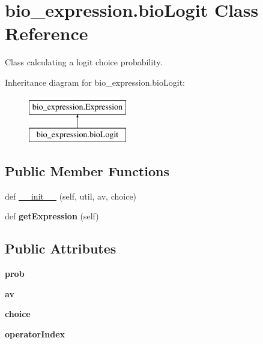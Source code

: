 \hypertarget{classbio__expression_1_1bio_logit}{}\section{bio\+\_\+expression.\+bio\+Logit Class Reference}
\label{classbio__expression_1_1bio_logit}


Class calculating a logit choice probability.  


Inheritance diagram for bio\+\_\+expression.\+bio\+Logit\+:\begin{figure}[H]
\begin{center}
\leavevmode
\includegraphics[height=2.000000cm]{classbio__expression_1_1bio_logit}
\end{center}
\end{figure}
\subsection*{Public Member Functions}
\begin{DoxyCompactItemize}
\item 
def \hyperlink{classbio__expression_1_1bio_logit_a25567c2014b5b34edc7769df7a3a312a}{\+\_\+\+\_\+init\+\_\+\+\_\+} (self, util, av, choice)
\item 
def {\bfseries get\+Expression} (self)\hypertarget{classbio__expression_1_1bio_logit_a35b306d8e0b89a2fd97d4d3649da531f}{}\label{classbio__expression_1_1bio_logit_a35b306d8e0b89a2fd97d4d3649da531f}

\end{DoxyCompactItemize}
\subsection*{Public Attributes}
\begin{DoxyCompactItemize}
\item 
{\bfseries prob}\hypertarget{classbio__expression_1_1bio_logit_ad5fd23e6737a77f2b75ef3efea466a93}{}\label{classbio__expression_1_1bio_logit_ad5fd23e6737a77f2b75ef3efea466a93}

\item 
{\bfseries av}\hypertarget{classbio__expression_1_1bio_logit_acf8d45c3bf980e2070c2003cf906f305}{}\label{classbio__expression_1_1bio_logit_acf8d45c3bf980e2070c2003cf906f305}

\item 
{\bfseries choice}\hypertarget{classbio__expression_1_1bio_logit_a8ab839cd1684c1d3171dc28018fa9fc6}{}\label{classbio__expression_1_1bio_logit_a8ab839cd1684c1d3171dc28018fa9fc6}

\item 
{\bfseries operator\+Index}\hypertarget{classbio__expression_1_1bio_logit_a08e2231bfabc66c1a35cb3a932d2fc45}{}\label{classbio__expression_1_1bio_logit_a08e2231bfabc66c1a35cb3a932d2fc45}

\end{DoxyCompactItemize}


